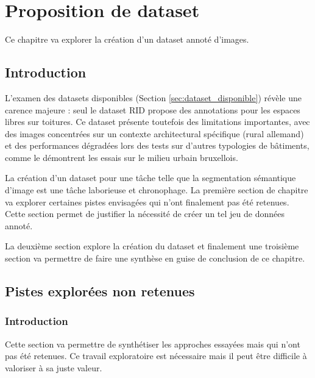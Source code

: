 \chapter{Proposition de dataset}
\label{chap:proposition_modele}

Ce chapitre va explorer la création d'un dataset annoté d'images.

\localtableofcontents

\newpage

\section{Introduction}
L'examen des datasets disponibles (Section \ref{sec:dataset_disponible}) révèle une carence majeure : seul le dataset RID propose des annotations pour les espaces libres sur toitures. Ce dataset présente toutefois des limitations importantes, avec des images concentrées sur un contexte architectural spécifique (rural allemand) et des performances dégradées lors des tests sur d'autres typologies de bâtiments, comme le démontrent les essais sur le milieu urbain bruxellois.

La création d'un dataset pour une tâche telle que la segmentation sémantique d'image est une tâche laborieuse et chronophage. La première section de chapitre va explorer certaines pistes envisagées qui n'ont finalement pas été retenues. Cette section permet de justifier la nécessité de créer un tel jeu de données annoté.

La deuxième section explore la création du dataset et finalement une troisième section va permettre de faire une synthèse en guise de conclusion de ce chapitre.

\section{Pistes explorées non retenues}
\subsection{Introduction}
Cette section va permettre de synthétiser les approches essayées mais qui n'ont pas été retenues. Ce travail exploratoire est nécessaire mais il peut être difficile à valoriser à sa juste valeur.

